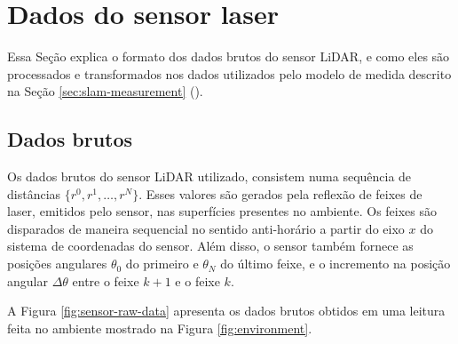 \section{Dados do sensor laser}
Essa Seção explica o formato dos dados brutos do sensor LiDAR, e como eles 
são processados e transformados nos dados utilizados pelo modelo de medida 
descrito na Seção \ref{sec:slam-measurement} ().

\subsection{Dados brutos}
Os dados brutos do sensor LiDAR utilizado, consistem numa sequência de 
distâncias $\{r^0, r^1, \dots, r^N\}$. Esses valores são gerados pela reflexão de feixes de laser, emitidos pelo sensor, nas superfícies 
presentes no ambiente. Os feixes são disparados de maneira sequencial no 
sentido anti-horário a partir do eixo $x$ do sistema de coordenadas do sensor. 
Além disso, o sensor também fornece as posições angulares $\theta_0$ 
do primeiro e $\theta_N$ do último feixe, e o incremento na posição angular $\Delta \theta$ entre o feixe $k+1$ e o feixe $k$.

A Figura \ref{fig:sensor-raw-data} apresenta os dados brutos obtidos em uma 
leitura feita no ambiente mostrado na Figura \ref{fig:environment}.


